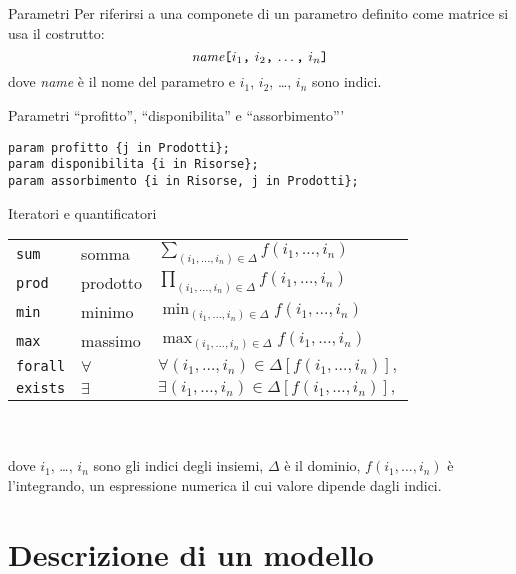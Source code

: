\documentclass{beamer}
\begin{document}
\begin{frame}{Parametri}
Per riferirsi a una componete di un parametro definito come
matrice si usa il costrutto:
$$
\mbox{{\it name}{\tt[}$i_1${\tt,} $i_2${\tt,} \dots{\tt,} $i_n${\tt]}}
$$
dove {\it name} \`e il nome del parametro e $i_1$, $i_2$,
\dots, $i_n$ sono indici.

\begin{block}{Parametri ``profitto'', ``disponibilita'' e ``assorbimento'''}
\begin{lstlisting}
param profitto {j in Prodotti};
param disponibilita {i in Risorse};
param assorbimento {i in Risorse, j in Prodotti};
\end{lstlisting}
\end{block}
\end{frame}

\begin{frame}{Iteratori e quantificatori}
\noindent\hfil
\begin{tabular}{@{}lll@{}}
{\tt sum}&somma&$\displaystyle\sum_{(i_1,\dots,i_n)\in\Delta}
f(i_1,\dots,i_n)$\\
{\tt prod}&prodotto&$\displaystyle\prod_{(i_1,\dots,i_n)\in\Delta}
f(i_1,\dots,i_n)$\\
{\tt min}&minimo&$\displaystyle\min_{(i_1,\dots,i_n)\in\Delta}
f(i_1,\dots,i_n)$\\
{\tt max}&massimo&$\displaystyle\max_{(i_1,\dots,i_n)\in\Delta}
f(i_1,\dots,i_n)$\\
{\tt forall}&$\forall$&$\displaystyle
\forall(i_1,\dots,i_n)\in\Delta[f(i_1,\dots,i_n)],$\\
{\tt exists}&$\exists$&$\displaystyle
\exists(i_1,\dots,i_n)\in\Delta[f(i_1,\dots,i_n)],$\\
\end{tabular}

\noindent \\~\\ dove $i_1$, \dots, $i_n$ sono gli indici degli insiemi,
$\Delta$ \`e il dominio,
$f(i_1,\dots,i_n)$ \`e l'integrando, un espressione numerica 
il cui valore dipende dagli indici.
\end{frame}

\section{Descrizione di un modello}
\end{document}
